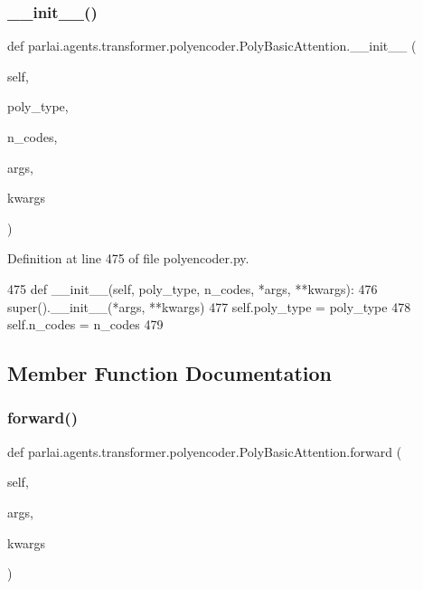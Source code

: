 \subsubsection{\texorpdfstring{\+\_\+\+\_\+init\+\_\+\+\_\+()}{\_\_init\_\_()}}
{\footnotesize\ttfamily def parlai.\+agents.\+transformer.\+polyencoder.\+Poly\+Basic\+Attention.\+\_\+\+\_\+init\+\_\+\+\_\+ (\begin{DoxyParamCaption}\item[{}]{self,  }\item[{}]{poly\+\_\+type,  }\item[{}]{n\+\_\+codes,  }\item[{}]{args,  }\item[{}]{kwargs }\end{DoxyParamCaption})}



Definition at line 475 of file polyencoder.\+py.


\begin{DoxyCode}
475     \textcolor{keyword}{def }\_\_init\_\_(self, poly\_type, n\_codes, *args, **kwargs):
476         super().\_\_init\_\_(*args, **kwargs)
477         self.poly\_type = poly\_type
478         self.n\_codes = n\_codes
479 
\end{DoxyCode}


\subsection{Member Function Documentation}
\mbox{\label{classparlai_1_1agents_1_1transformer_1_1polyencoder_1_1PolyBasicAttention_a6927374c5336d0111ab936c1fd2b62ff}} 
\subsubsection{\texorpdfstring{forward()}{forward()}}
{\footnotesize\ttfamily def parlai.\+agents.\+transformer.\+polyencoder.\+Poly\+Basic\+Attention.\+forward (\begin{DoxyParamCaption}\item[{}]{self,  }\item[{}]{args,  }\item[{}]{kwargs }\end{DoxyParamCaption})}

